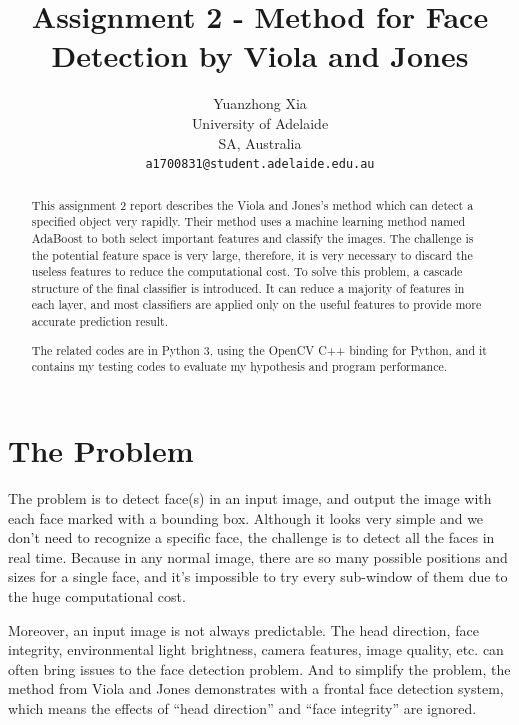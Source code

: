 \documentclass[10pt,twocolumn,letterpaper]{article}
\begin{document}
\title{Assignment 2 - Method for Face Detection by Viola and Jones}
\author{Yuanzhong Xia\\
University of Adelaide\\
SA, Australia\\
{\tt\small a1700831@student.adelaide.edu.au}
}
\maketitle

\begin{abstract}
This assignment 2 report describes the Viola and Jones's method \cite{origin} which can detect a specified object very rapidly.
Their method uses a machine learning method named AdaBoost \cite{adaboost} to both select important features and classify the images.
The challenge is the potential feature space is very large, therefore, it is very necessary to discard the useless features to reduce the computational cost.
To solve this problem, a cascade structure of the final classifier is introduced. It can reduce a majority of features in each layer,
and most classifiers are applied only on the useful features to provide more accurate prediction result.

The related codes are in Python 3, using the OpenCV C++ binding for Python,
and it contains my testing codes to evaluate my hypothesis and program performance.
\end{abstract}


\section{The Problem}
The problem is to detect face(s) in an input image, and output the image with each face marked with a bounding box.
Although it looks very simple and we don't need to recognize a specific face, the challenge is to detect all the faces in real time.
Because in any normal image, there are so many possible positions and sizes for a single face,
and it's impossible to try every sub-window of them due to the huge computational cost.

Moreover, an input image is not always predictable. The head direction, face integrity, environmental light brightness,
camera features, image quality, etc. can often bring issues to the face detection problem.
And to simplify the problem, the method from Viola and Jones demonstrates with a frontal face detection system,
which means the effects of ``head direction'' and ``face integrity'' are ignored.
\end{document}

